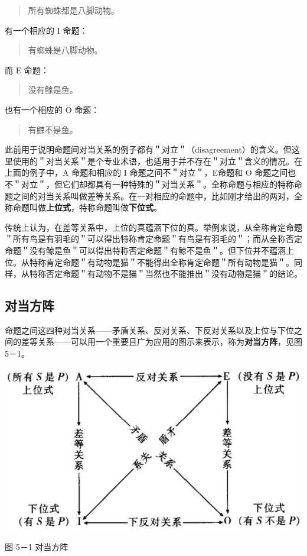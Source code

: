 \begin{quote}
所有蜘蛛都是八脚动物。
\end{quote}

有一个相应的 I 命题：

\begin{quote}
有蜘蛛是八脚动物。
\end{quote}

而 E 命题：

\begin{quote}
没有鲸是鱼。
\end{quote}

也有一个相应的 O 命题：

\begin{quote}
有鲸不是鱼。
\end{quote}

此前用于说明命题间对当关系的例子都有＂对立＂（disagreement）的含义。但这里使用的＂对当关系＂是个专业术语，也适用于并不存在＂对立＂含义的情况。在上面的例子中，A 命题和相应的 I 命题之间不＂对立＂，E命题和 O 命题之间也不＂对立＂，但它们却都具有一种特殊的＂对当关系＂。全称命题与相应的特称命题之间的对当关系叫做差等关系。在一对相应的命题中，比如刚才给出的两对，全称命题叫做\textbf{上位式}，特称命题叫做\textbf{下位式}。

传统上认为，在差等关系中，上位的真蕴涵下位的真。举例来说，从全称肯定命题＂所有鸟是有羽毛的＂可以得出特称肯定命题＂有鸟是有羽毛的＂；而从全称否定命题＂没有鲸是鱼＂可以得出特称否定命题＂有鲸不是鱼＂。但下位并不蕴涵上位。从特称肯定命题＂有动物是猫＂不能得出全称肯定命题＂所有动物是猫＂。同样，从特称否定命题＂有动物不是猫＂当然也不能推出＂没有动物是猫＂的结论。

\subsection{对当方阵}
命题之间这四种对当关系——矛盾关系、反对关系、下反对关系以及上位与下位之间的差等关系——可以用一个重要且广为应用的图示来表示，称为\textbf{对当方阵}，见图 5－1。

\begin{center}
\includegraphics[width=\textwidth]{images/2025_05_15_6a28331d5e7c993ad07ag-238.jpg}

图 5－1 对当方阵
\end{center}


